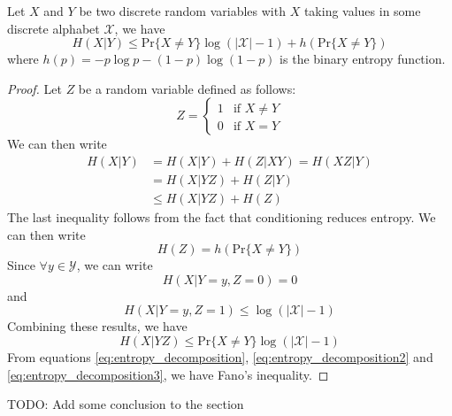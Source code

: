 \begin{theorem}\label{thm:fano_inequality}
    Let $X$ and $Y$ be two discrete random variables with $X$ taking values in some discrete alphabet $\mathcal{X}$, we have
    \begin{equation}
        H(X|Y) \leq \text{Pr}\{X \neq Y\} \log (|\mathcal{X}|-1) + h(\text{Pr}\{X \neq Y\})
    \end{equation}
    where $h(p) = -p\log p - (1-p)\log(1-p)$ is the binary entropy function.
\end{theorem}
\begin{proof}
    Let $Z$ be a random variable defined as follows:
    \begin{equation}\label{eq:random_variable_Z}
        Z = \begin{cases}
            1 & \text{if } X \neq Y \\
            0 & \text{if } X = Y
        \end{cases}
    \end{equation}
    We can then write
    \begin{align} \label{eq:entropy_decomposition}
        H(X|Y) &= H(X|Y) + H(Z|XY) = H(XZ|Y) \nonumber \\
        &= H(X|YZ) + H(Z|Y) \nonumber \\
        &\leq H(X|YZ) + H(Z)
    \end{align}
    The last inequality follows from the fact that conditioning reduces entropy. We can then write
    \begin{equation} \label{eq:entropy_decomposition2}
        H(Z) = h(\text{Pr}\{X \neq Y\})
    \end{equation}
    Since $\forall y \in \mathcal{Y}$, we can write
    \begin{equation}
        H(X | Y =y, Z =0) =0
    \end{equation}
    and
    \begin{equation}
        H(X| Y = y, Z = 1) \leq \log(|\mathcal{X}|-1)
    \end{equation}
    Combining these results, we have
    \begin{equation} \label{eq:entropy_decomposition3}
        H(X | YZ) \leq \text{Pr}\{X \neq Y\} \log (|\mathcal{X}|-1)
    \end{equation}
    From equations \ref{eq:entropy_decomposition}, \ref{eq:entropy_decomposition2} and \ref{eq:entropy_decomposition3}, we have Fano's inequality.
\end{proof}
TODO: Add some conclusion to the section
\clearpage
